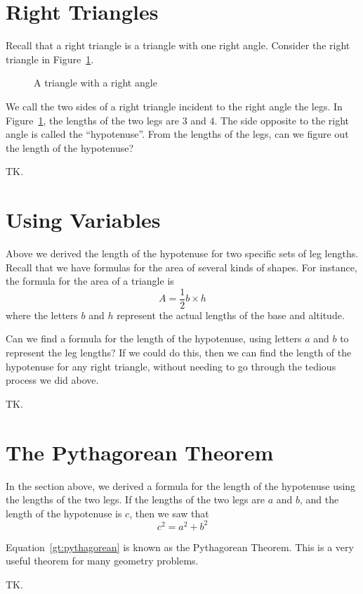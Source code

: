 \documentclass[a4paper,10pt]{report}
\begin{document}
\section{Right Triangles}

Recall that a \gls{right triangle} is a triangle with one right angle. Consider
the right triangle in Figure~\ref{gt:triangle-345}.

\begin{figure}

  \caption{A triangle with a right angle}
  \label{gt:triangle-345}
\end{figure}

We call the two sides of a right triangle incident to the right angle the legs.
In Figure~\ref{gt:triangle-345}, the lengths of the two legs are \(3\) and
\(4\). The side opposite to the right angle is called the ``hypotenuse''. From
the lengths of the legs, can we figure out the length of the hypotenuse?

TK.

\section{Using Variables}

Above we derived the length of the hypotenuse for two specific sets of leg
lengths. Recall that we have formulas for the area of several kinds of shapes.
For instance, the formula for the area of a triangle is \[
  A = \frac{1}{2} b \times h
\] where the letters \(b\) and \(h\) represent the actual lengths of the base
and altitude.

Can we find a formula for the length of the hypotenuse, using letters \(a\) and
\(b\) to represent the leg lengths? If we could do this, then we can find the
length of the hypotenuse for any right triangle, without needing to go through
the tedious process we did above.

TK.

\section{The Pythagorean Theorem}

In the section above, we derived a formula for the length of the hypotenuse
using the lengths of the two legs. If the lengths of the two legs are \(a\) and
\(b\), and the length of the hypotenuse is \(c\), then we saw that
\begin{equation}
  \label{gt:pythagorean}
  c^2 = a^2 + b^2
\end{equation}

Equation~\ref{gt:pythagorean} is known as the Pythagorean Theorem. This is a
very useful theorem for many geometry problems.

TK.


\printglossaries

\cleardoublepage
{}
\listoffigures
\end{document}
